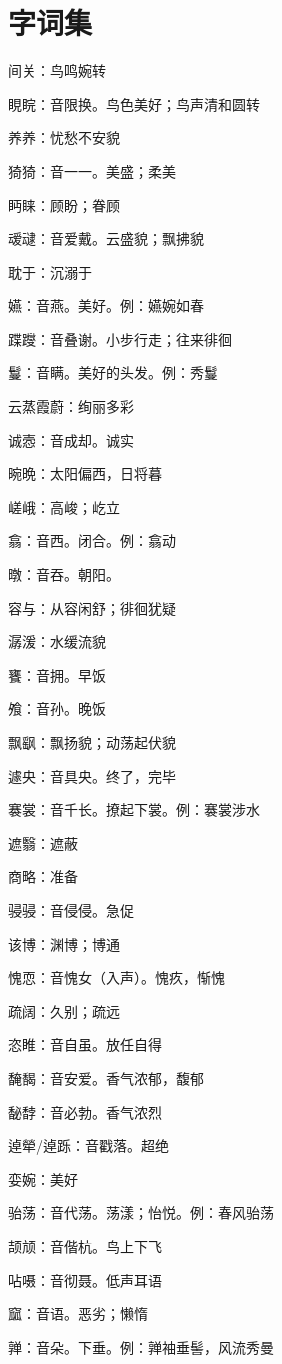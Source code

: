 \section{字词集}
间关：鸟鸣婉转

睍睆：音限换。鸟色美好；鸟声清和圆转

养养：忧愁不安貌

猗猗：音一一。美盛；柔美

眄睐：顾盼；眷顾

叆叇：音爱戴。云盛貌；飘拂貌

耽于：沉溺于

嬿：音燕。美好。例：嬿婉如春

蹀躞：音叠谢。小步行走；往来徘徊

鬘：音瞒。美好的头发。例：秀鬘

云蒸霞蔚：绚丽多彩

诚悫：音成却。诚实

晼晩：太阳偏西，日将暮

嵯峨：高峻；屹立

翕：音西。闭合。例：翕动

暾：音吞。朝阳。

容与：从容闲舒；徘徊犹疑

潺湲：水缓流貌

饔：音拥。早饭

飧：音孙。晚饭

飘飖：飘扬貌；动荡起伏貌

遽央：音具央。终了，完毕

褰裳：音千长。撩起下裳。例：褰裳涉水

遮翳：遮蔽

商略：准备

骎骎：音侵侵。急促

该博：渊博；博通

愧恧：音愧女（入声）。愧疚，惭愧

疏阔：久别；疏远

恣睢：音自虽。放任自得

馣馤：音安爱。香气浓郁，馥郁

馝馞：音必勃。香气浓烈

逴犖/逴跞：音戳落。超绝

娈婉：美好

骀荡：音代荡。荡漾；怡悦。例：春风骀荡

颉颃：音偕杭。鸟上下飞

呫嗫：音彻聂。低声耳语

窳：音语。恶劣；懒惰

亸：音朵。下垂。例：亸袖垂髻，风流秀曼

